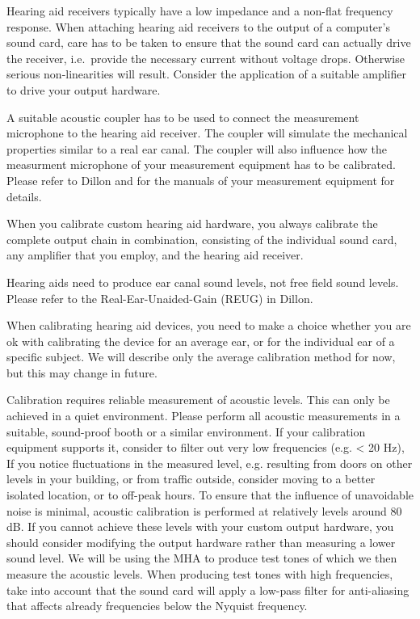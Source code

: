 \documentclass[11pt,a4paper,twoside]{article}
\newcommand{\+}{\discretionary{\mbox{\scriptsize$\hookleftarrow$}}{}{}}
\begin{document}
Hearing aid receivers typically have a low impedance and a non-flat frequency response.
%
When attaching hearing aid receivers to the output of a computer's
sound card, care has to be taken to ensure that the sound card can
actually drive the receiver, i.e.\ provide the necessary current
without voltage drops.
%
Otherwise serious non-linearities will result.
%
Consider the application of a suitable amplifier to drive your output hardware.

A suitable acoustic coupler has to be used to connect the measurement
microphone to the hearing aid receiver.
%
The coupler will simulate the mechanical properties similar to
a real ear canal.
%
The coupler will also influence how the measurment microphone of your
measurement equipment has to be calibrated.
%
Please refer to Dillon and for the manuals of your measurement
equipment for details.

When you calibrate custom hearing aid hardware, you always calibrate
the complete output chain in combination, consisting of
%
the individual sound card, any amplifier that you employ, and the
hearing aid receiver.

Hearing aids need to produce ear canal sound levels, not free field
sound levels.
%
Please refer to the Real-Ear-Unaided-Gain (REUG) in Dillon.

When calibrating hearing aid devices, you need to make a choice
whether you are ok with calibrating the device for an average ear, or
for the individual ear of a specific subject.
%
We will describe only the average calibration method for now, but this
may change in future.

Calibration requires reliable measurement of acoustic levels.
%
This can only be achieved in a quiet environment.
%
Please perform all acoustic measurements in a suitable, sound-proof
booth or a similar environment.
%
If your calibration equipment supports it, consider to filter out very
low frequencies (e.g. < 20 Hz),
%
If you notice fluctuations in the measured level, e.g. resulting from
doors on other levels in your building, or from traffic outside,
consider moving to a better isolated location, or to off-peak hours.
%
To ensure that the influence of unavoidable noise is minimal,
acoustic calibration is performed at relatively levels around 80 dB.
%
If you cannot achieve these levels with your custom output hardware,
you should consider modifying the output hardware rather than
measuring a lower sound level.
%
We will be using the MHA to produce test tones of which we then
measure the acoustic levels.
%
When producing test tones with high frequencies, take into account
that the sound card will apply a low-pass filter for anti-aliasing
that affects already frequencies below the Nyquist frequency.
\end{document}
